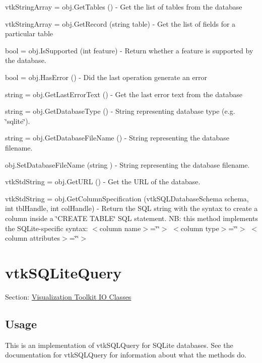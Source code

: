 \begin{DoxyItemize}
\item {\ttfamily vtk\-String\-Array = obj.\-Get\-Tables ()} -\/ Get the list of tables from the database  
\item {\ttfamily vtk\-String\-Array = obj.\-Get\-Record (string table)} -\/ Get the list of fields for a particular table  
\item {\ttfamily bool = obj.\-Is\-Supported (int feature)} -\/ Return whether a feature is supported by the database.  
\item {\ttfamily bool = obj.\-Has\-Error ()} -\/ Did the last operation generate an error  
\item {\ttfamily string = obj.\-Get\-Last\-Error\-Text ()} -\/ Get the last error text from the database  
\item {\ttfamily string = obj.\-Get\-Database\-Type ()} -\/ String representing database type (e.\-g. \char`\"{}sqlite\char`\"{}).  
\item {\ttfamily string = obj.\-Get\-Database\-File\-Name ()} -\/ String representing the database filename.  
\item {\ttfamily obj.\-Set\-Database\-File\-Name (string )} -\/ String representing the database filename.  
\item {\ttfamily vtk\-Std\-String = obj.\-Get\-U\-R\-L ()} -\/ Get the U\-R\-L of the database.  
\item {\ttfamily vtk\-Std\-String = obj.\-Get\-Column\-Specification (vtk\-S\-Q\-L\-Database\-Schema schema, int tbl\-Handle, int col\-Handle)} -\/ Return the S\-Q\-L string with the syntax to create a column inside a \char`\"{}\-C\-R\-E\-A\-T\-E T\-A\-B\-L\-E\char`\"{} S\-Q\-L statement. N\-B\-: this method implements the S\-Q\-Lite-\/specific syntax\-: $<$column name$>$=\char`\"{}\char`\"{}$>$ $<$column type$>$=\char`\"{}\char`\"{}$>$ $<$column attributes$>$=\char`\"{}\char`\"{}$>$  
\end{DoxyItemize}\hypertarget{vtkio_vtksqlitequery}{}\section{vtk\-S\-Q\-Lite\-Query}\label{vtkio_vtksqlitequery}
Section\-: \hyperlink{sec_vtkio}{Visualization Toolkit I\-O Classes} \hypertarget{vtkwidgets_vtkxyplotwidget_Usage}{}\subsection{Usage}\label{vtkwidgets_vtkxyplotwidget_Usage}
This is an implementation of vtk\-S\-Q\-L\-Query for S\-Q\-Lite databases. See the documentation for vtk\-S\-Q\-L\-Query for information about what the methods do.

